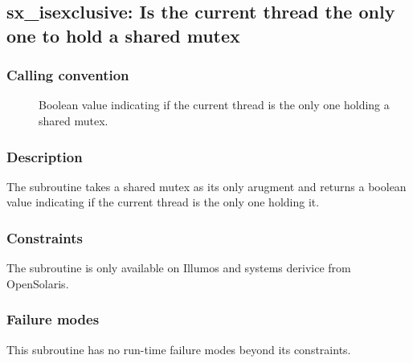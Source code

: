 \clearpage
{}
{}
\label{subr:sx-isexclusive}
\subsection*{sx\_isexclusive: Is the current thread the only one to
  hold a shared mutex }

\subsubsection*{Calling convention}

\begin{description}
\item[] Boolean value indicating if the current thread
  is the only one holding a shared mutex.
\end{description}

\subsubsection*{Description}

The  subroutine takes a shared mutex as
its only arugment and returns a boolean value indicating if the
current thread is the only one holding it.

\subsubsection*{Constraints}

The  subroutine is only available on
Illumos and systems derivice from OpenSolaris.

\subsubsection*{Failure modes}

This subroutine has no run-time failure modes beyond its constraints.
